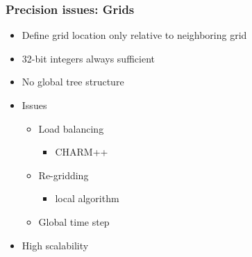     \begin{frame}[fragile] \frametitle{Precision issues: Grids}
      \begin{itemize}
        \item Define grid location only relative to neighboring grid
        \item 32-bit integers always sufficient
        \item No global tree structure
        \item Issues
        \begin{itemize}
          \item Load balancing
          \begin{itemize}
            \item CHARM++
          \end{itemize}
          \item Re-gridding
          \begin{itemize}
            \item local algorithm
          \end{itemize}
          \item Global time step
        \end{itemize}
        \item High scalability
      \end{itemize}
\end{frame}
